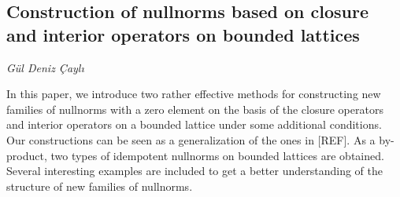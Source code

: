 \documentclass[../booklet.tex]{subfiles}
\begin{document}
\subsection[Construction of nullnorms based on closure and interior operators on bounded lattices. {\it Gül Deniz Çaylı}]{Construction of nullnorms based on closure and interior operators on bounded lattices}

\begin{center}
  {\it Gül Deniz Çaylı}
\end{center}

\vskip 0.8cm


In this paper, we introduce two rather effective methods for constructing new families of nullnorms
with a zero element on the basis of the closure operators and interior operators on a
bounded lattice under some additional conditions. Our constructions can be seen as a
generalization of the ones in [REF]. As a by-product, two types of idempotent nullnorms
on bounded lattices are obtained. Several interesting examples are included to get a better
understanding of the structure of new families of nullnorms.

\end{document}
